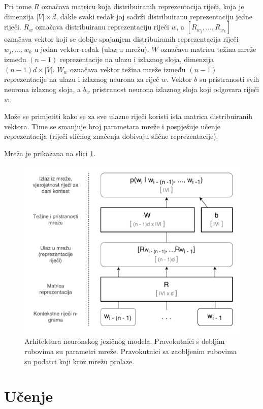 \documentclass[times, utf8, diplomski, numeric]{fer}
\begin{document}
Pri tome $R$ označava matricu koja distribuiranih reprezentacija riječi, koja je dimenzija $|V| \times d$, dakle svaki redak joj sadrži distribuiranu reprezentaciju jedne riječi. $R_w$ označava distribuiranu reprezentaciju riječi $w$, a $\left[R_{w_j}, ..., R_{w_k}\right]$ označava vektor koji se dobije spajanjem distribuiranih reprezentacija riječi $w_j, ..., w_k$ u jedan vektor-redak (ulaz u mrežu). $W$ označava matricu težina  mreže između $(n - 1)$ reprezentacije na ulazu i izlaznog sloja, dimenzija $(n - 1) d \times |V|$. $W_w$ označava vektor težina mreže između $(n - 1)$ reprezentacije na ulazu i izlaznog neurona za riječ $w$. Vektor $b$ su pristranosti  svih neurona izlaznog sloja, a $b_w$ pristranost neurona izlaznog sloja koji odgovara riječi $w$.

Može se primjetiti kako se za sve ulazne riječi koristi ista matrica distribuiranih vektora. Time se smanjuje broj parametara mreže i pospješuje učenje reprezentacija (riječi sličnog značenja dobivaju slične reprezentacije).

Mreža je prikazana na slici \ref{fig:nnet}.

\begin{figure}[!htb]
\centering
\includegraphics[scale=0.5]{fig/nnet.pdf}
\caption{Arhitektura neuronskog jezičnog modela. Pravokutnici s debljim rubovima su parametri mreže. Pravokutnici sa zaobljenim rubovima su podatci koji kroz mrežu prolaze.}
\label{fig:nnet}
\end{figure}

\section{Učenje}
\label{sec:nnet_training}
\end{document}
